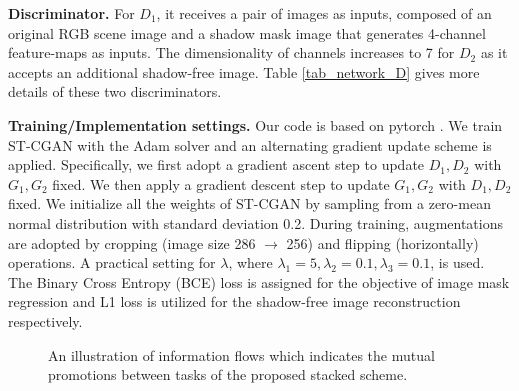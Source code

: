 \documentclass[10pt,twocolumn,letterpaper]{article}
\begin{document}
\noindent \textbf{Discriminator.} For $D_1$, it receives a pair of images as inputs, composed of an original RGB scene image and a shadow mask image that generates 4-channel feature-maps as inputs. The dimensionality of channels increases to 7 for $D_2$ as it accepts an additional shadow-free image. Table \ref{tab_network_D} gives more details of these two discriminators.



\noindent \textbf{Training/Implementation settings.} Our code is based on pytorch \cite{ketkar2017introduction}. We train ST-CGAN with the Adam solver \cite{kingma2014adam} and an alternating gradient update scheme is applied. Specifically, we first adopt a gradient ascent step to update $D_1, D_2$
with $G_1,G_2$ fixed. We then apply a gradient descent step to update $G_1,G_2$
with $D_1, D_2$ fixed. We initialize all the weights of ST-CGAN by sampling from a zero-mean normal distribution with standard deviation 0.2. During training, augmentations are adopted by cropping (image size 286 $\to$ 256) and flipping (horizontally) operations. A practical setting for $\lambda$, where $\lambda_1 = 5, \lambda_2 = 0.1, \lambda_3 = 0.1$, is used. The Binary Cross Entropy (BCE) loss is assigned for the objective of image mask regression and L1 loss is utilized for the shadow-free image reconstruction respectively.

\begin{figure}[t]
	\begin{center}
		\setlength{\fboxrule}{0pt}
	\end{center}
	\vspace{-5pt}
	\caption{An illustration of information flows which indicates the mutual promotions between tasks of the proposed stacked scheme.}
	\label{fig_flow_cropped}
	\vspace{-5pt}
\end{figure}
\end{document}
